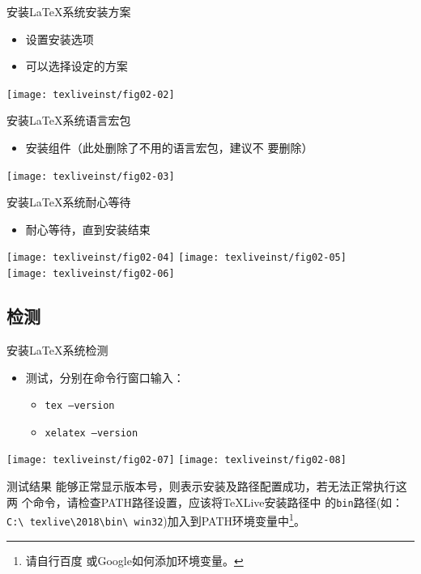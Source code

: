 \documentclass[xcolor=svgnames, t, aspectratio=169]{ctexbeamer}
\begin{document}
\begin{frame}[t]{安装\LaTeX 系统}{安装方案}
  \begin{itemize}
  \item 设置安装选项
  \item 可以选择设定的方案
  \end{itemize}
  \centering
  \texttt{[image: texliveinst/fig02-02]}
\end{frame}

\begin{frame}[t]{安装\LaTeX 系统}{语言宏包}
  \begin{itemize}
  \item 安装组件（此处删除了不用的语言宏包，\alert{建议不
      要删除}）
  \end{itemize}
  \centering
  \texttt{[image: texliveinst/fig02-03]}
\end{frame}

\begin{frame}[t]{安装\LaTeX 系统}{耐心等待}
    \begin{itemize}
    \item 耐心等待，直到安装结束
    \end{itemize}
    \centering
    \texttt{[image: texliveinst/fig02-04]}
    \qquad
    \texttt{[image: texliveinst/fig02-05]}
    \\[1ex]
    \texttt{[image: texliveinst/fig02-06]}
\end{frame}
\subsection[检测]{检测\TeXLive }
\begin{frame}[t]{安装\LaTeX 系统}{检测\TeXLive }
  \stretchon
  \begin{itemize}
  \item 测试，分别在命令行窗口输入：
    \begin{itemize}
    \item {\texttt{tex --version}}
    \item {\texttt{xelatex --version}}
    \end{itemize}
  \end{itemize}
  \centering 
  \texttt{[image: texliveinst/fig02-07]}
  \qquad
  \texttt{[image: texliveinst/fig02-08]}
  \begin{minipage}[h]{0.6\linewidth}
    \begin{block}{测试结果}
      \scriptsize      
      能够正常显示版本号，则表示安装及路径配置成功，若无法正常执行这两
      个命令，请检查PATH路径设置，应该将{\TeX}Live安装路径中
      的\texttt{bin}路径(如：\texttt{C:\textbackslash
        texlive\textbackslash 2018\textbackslash bin\textbackslash
        win32})加入到PATH环境变量中\footnote[frame]{请自行百度
        或Google如何添加环境变量。}。
    \end{block}
  \end{minipage}
  \stretchoff
\end{frame}
\end{document}
